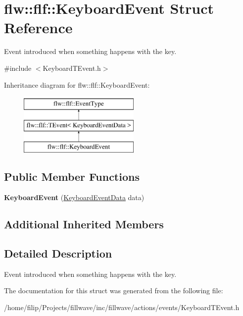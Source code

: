 \hypertarget{classflw_1_1flf_1_1KeyboardEvent}{}\section{flw\+:\+:flf\+:\+:Keyboard\+Event Struct Reference}
\label{classflw_1_1flf_1_1KeyboardEvent}


Event introduced when something happens with the key.  




{\ttfamily \#include $<$Keyboard\+T\+Event.\+h$>$}

Inheritance diagram for flw\+:\+:flf\+:\+:Keyboard\+Event\+:\begin{figure}[H]
\begin{center}
\leavevmode
\includegraphics[height=3.000000cm]{classflw_1_1flf_1_1KeyboardEvent}
\end{center}
\end{figure}
\subsection*{Public Member Functions}
\begin{DoxyCompactItemize}
\item 
{\bfseries Keyboard\+Event} (\hyperlink{structflw_1_1flf_1_1KeyboardEventData}{Keyboard\+Event\+Data} data)\hypertarget{classflw_1_1flf_1_1KeyboardEvent_a9b9b33118361421d25568fe9d79985e4}{}\label{classflw_1_1flf_1_1KeyboardEvent_a9b9b33118361421d25568fe9d79985e4}

\end{DoxyCompactItemize}
\subsection*{Additional Inherited Members}


\subsection{Detailed Description}
Event introduced when something happens with the key. 

The documentation for this struct was generated from the following file\+:\begin{DoxyCompactItemize}
\item 
/home/filip/\+Projects/fillwave/inc/fillwave/actions/events/Keyboard\+T\+Event.\+h\end{DoxyCompactItemize}
